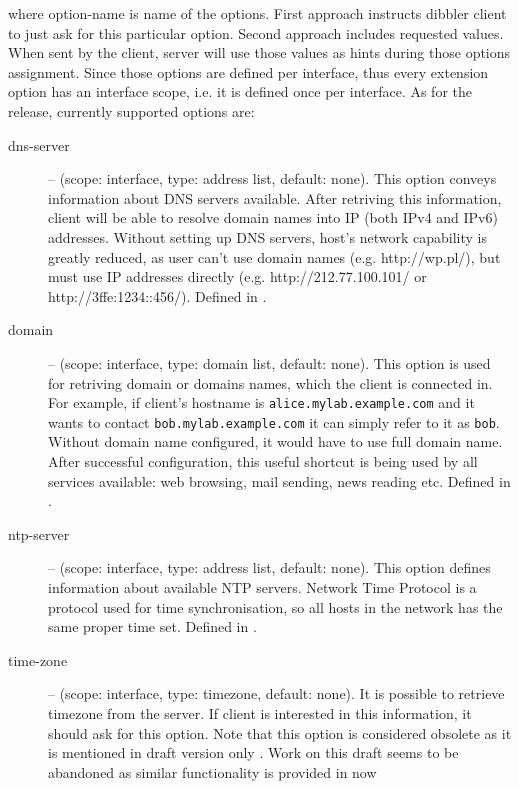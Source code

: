 where option-name is name of the options. First approach instructs
dibbler client to just ask for this particular option. Second approach
includes requested values. When sent by the client, server will use
those values as hints during those options assignment. Since those
options are defined per interface, thus every extension option has an
interface scope, i.e. it is defined once per interface. As for the
\version release, currently supported options are:

\begin{description}
 \item[dns-server] -- (scope: interface, type: address list, default:
	    none). This option conveys information about DNS servers
	    available. After retriving this information, client will be
	    able to resolve domain names into IP (both IPv4 and IPv6)
	    addresses. Without setting up DNS servers, host's network
	    capability is greatly reduced, as user can't use domain
	    names (e.g. http://wp.pl/), but must use IP addresses
	    directly (e.g. http://212.77.100.101/ or
	    http://3ffe:1234::456/). Defined in \cite{rfc3596}.
 \item[domain] -- (scope: interface, type: domain list, default:
	    none). This option is used for retriving domain or domains
	    names, which the client is connected in. For example, if
	    client's hostname is \verb+alice.mylab.example.com+ and it wants to
	    contact \verb+bob.mylab.example.com+ it can simply refer to it as
	    \verb+bob+. Without domain name configured, it would have to
	    use full domain name. After successful configuration, this
	    useful shortcut is being used by all services available: web
	    browsing, mail sending, news reading etc. Defined in
	    \cite{rfc3596}.
 \item[ntp-server] -- (scope: interface, type: address list, default:
	    none). This option defines information about available NTP
	    servers. Network Time Protocol \cite{rfc2030} is a protocol used
	    for time synchronisation, so all hosts in the network has
	    the same proper time set. Defined in \cite{rfc4075}.
 \item[time-zone] -- (scope: interface, type: timezone, default:
	    none). It is possible to retrieve timezone from the
	    server. If client is interested in this information, it
	    should ask for this option. Note that this option is
	    considered obsolete as it is mentioned in draft version only
	    \cite{draft-timezone}. Work on this draft seems to be
	    abandoned as similar functionality is provided in now

\end{description}
